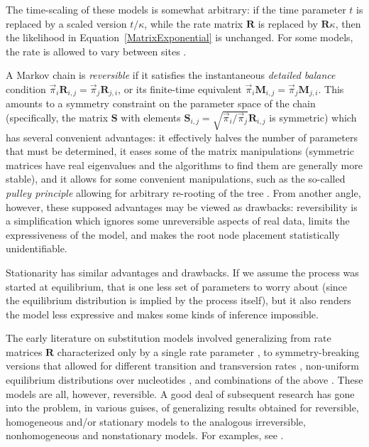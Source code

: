 \documentclass{bmcart}
\newcommand{\matr}[1]{\mathbf{#1}}
\newcommand{\eqref}[1]{Equation~\ref{#1}}
\newcommand{\ratematrix}{\matr{R}}
\newcommand{\eqmvec}{\vec{\pi}}
\newcommand{\condmatrix}{\matr{M}}
\begin{document}
The time-scaling of these models is somewhat arbitrary:
if the time parameter $t$ is replaced by a scaled version $t/\kappa$,
while the rate matrix $\ratematrix$ is replaced by $\ratematrix \kappa$,
then the likelihood in \eqref{MatrixExponential} is unchanged.
For some models, the rate is allowed to vary between sites \cite{Yang93,Yang94}.

A Markov chain is {\em reversible} if it satisfies the instantaneous {\em detailed balance} condition
$\eqmvec_i \ratematrix_{i,j} = \eqmvec_j \ratematrix_{j,i}$,
or its finite-time equivalent
$\eqmvec_i \condmatrix_{i,j} = \eqmvec_j \condmatrix_{j,i}$.
This amounts to a symmetry constraint on the parameter space of the chain
(specifically, the matrix $\matr{S}$ with elements $\matr{S}_{i,j} = \sqrt{\eqmvec_i / \eqmvec_j} \ratematrix_{i,j}$ is symmetric)
which has several convenient advantages: it effectively halves the number of parameters that must be
determined, it eases some of the matrix manipulations (symmetric matrices have real eigenvalues
and the algorithms to find them are generally more stable),
and it allows for some convenient manipulations, such as the so-called
{\em pulley principle} allowing for arbitrary re-rooting of the tree \cite{Felsenstein81}.
From another angle, however, these supposed advantages may be viewed as drawbacks:
reversibility is a simplification which ignores some unreversible aspects of real data,
limits the expressiveness of the model, and makes the root node placement statistically unidentifiable.

Stationarity has similar advantages and drawbacks.
If we assume the process was started at equilibrium, that is one less set of parameters to worry about
(since the equilibrium distribution is implied by the process itself), but it also renders the model
less expressive and makes some kinds of inference impossible.

The early literature on substitution models involved generalizing from rate matrices $\ratematrix$
characterized only by a single rate parameter \cite{JukesCantor69},
to symmetry-breaking versions that allowed for different transition and transversion rates
 \cite{Kimura80}, non-uniform equilibrium distributions over nucleotides \cite{Felsenstein81},
and combinations of the above \cite{HasegawaEtal85}.
These models are all, however, reversible.
A good deal of subsequent research has gone into the problem, in various guises, of generalizing results obtained
for reversible, homogeneous and/or stationary models to the analogous irreversible, nonhomogeneous and nonstationary models.
For examples, see \cite{pmid9600890,pmid22644340,pmid15210317,pmid27774306}.
\color{black}
\end{document}
